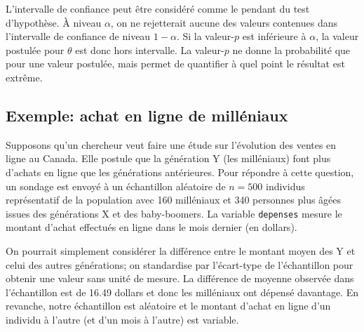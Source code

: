 \documentclass[
  11pt,
  letterpaper,
]{book}
\begin{document}
L'intervalle de confiance peut être considéré comme le pendant du test d'hypothèse. À niveau \(\alpha\), on ne rejetterait aucune des valeurs contenues dans l'intervalle de confiance de niveau \(1-\alpha\). Si la valeur-\(p\) est inférieure à \(\alpha\), la valeur postulée pour \(\theta\) est donc hors intervalle. La valeur-\(p\) ne donne la probabilité que pour une valeur postulée, mais permet de quantifier à quel point le résultat est extrême.

\hypertarget{exemple-achat-en-ligne-de-milluxe9niaux}{%
\subsection{Exemple: achat en ligne de milléniaux}\label{exemple-achat-en-ligne-de-milluxe9niaux}}

Supposons qu'un chercheur veut faire une étude sur l'évolution des ventes en ligne au Canada. Elle postule que la génération Y (les milléniaux) font plus d'achats en ligne que les générations antérieures. Pour répondre à cette question, un sondage est envoyé à un échantillon aléatoire de \(n=500\) individus représentatif de la population avec 160 milléniaux et 340 personnes plus âgées issues des générations X et des baby-boomers. La variable \texttt{depenses} mesure le montant d'achat effectués en ligne dans le mois dernier (en dollars).

On pourrait simplement considérer la différence entre le montant moyen des Y et celui des autres générations; on standardise par l'écart-type de l'échantillon pour obtenir une valeur sans unité de mesure. La différence de moyenne observée dans l'échantillon est de 16.49 dollars et donc les milléniaux ont dépensé davantage. En revanche, notre échantillon est aléatoire et le montant d'achat en ligne d'un individu à l'autre (et d'un mois à l'autre) est variable.
\end{document}
